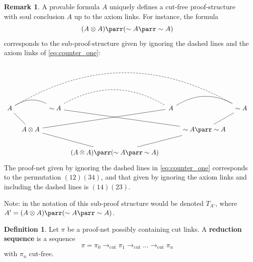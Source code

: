 \documentclass[12pt]{article}
\theoremstyle{plain}
\theoremstyle{definition}
\newtheorem{defn}[thm]{Definition} %
\newtheorem{remark}[thm]{Remark}
\newcommand{\lto}{\longrightarrow}
\newcommand{\negation}{\sim}
\begin{document}
\begin{remark}
A provable formula $A$ uniquely defines a cut-free proof-structure with soul conclusion $A$ up to the axiom links. For instance, the formula 
\begin{equation}
(A \otimes A) \parr (\negation A \parr \negation A)
\end{equation}
corresponds to the sub-proof-structure given by ignoring the dashed lines and the axiom links of \eqref{eq:counter_one}:
\begin{equation}\label{eq:counter_one}
\begin{tikzcd}[column sep = tiny]
A \arrow[rr,dash, bend left] \arrow[rd,dash]\arrow[rrrrrr,bend left,dash,dashed] &                         & \negation A \arrow[rr,dash,bend left, dashed] \arrow[rrrd,dash] &                                                     & A \arrow[rr,dash, bend left] \arrow[llld,dash] &                                           & \negation A \arrow[ld,dash] \\
                                   & A \otimes A \arrow[rrd,dash] &                        &                                                     &                                    & \negation A \parr \negation A \arrow[lld,dash] &                        \\
                                   &                         &                        & (A \otimes A) \parr (\negation A \parr \negation A) &                                    &                                           &                       
\end{tikzcd}
\end{equation}
The proof-net given by ignoring the dashed lines in \eqref{eq:counter_one} corresponds to the permutation $(12)(34)$, and that given by ignoring the axiom links and including the dashed lines is $(14)(23)$.

Note: in the notation of \cite{multiplicatives} this sub-proof structure would be denoted $T_{A'}$, where $A' = (A \otimes A) \parr (\negation A \parr \negation A)$.
\end{remark}
\begin{defn}
Let $\pi$ be a proof-net possibly containing cut links. A \textbf{reduction sequence} is a sequence
\begin{equation}
    \pi = \pi_0 \lto_{\operatorname{cut}} \pi_1 \lto_{\operatorname{cut}} \hdots \lto_{\operatorname{cut}} \pi_n
\end{equation}
with $\pi_n$ cut-free.
\end{defn}
\end{document}

